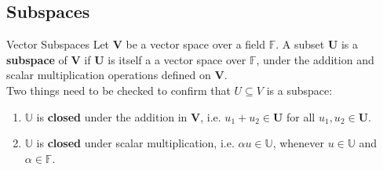 \documentclass[a4paper, 9pt]{extarticle}
\begin{document}
\subsection{Subspaces}
\begin{definitionbox}{Vector Subspaces}{}
  Let $\mathbf{V}$ be a vector space over a field $\mathbb{F}$. A subset $\mathbf{U}$ is a \textbf{subspace} of $\mathbf{V}$ if $\mathbf{U}$ is itself a a vector space over $\mathbb{F}$, under  the addition and scalar multiplication operations defined on $\mathbf{V}$.\\[2ex]

  Two things need to be checked to confirm that $U \subseteq V$ is a subspace:
  \begin{enumerate}
    \item $\mathbb{U}$ is \textbf{closed} under the addition in $\mathbf{V}$, i.e. $u_1 + u_2 \in \mathbf{U}$ for all $u_1,u_2 \in \mathbf{U}$.
    \item $\mathbb{U}$ is \textbf{closed} under scalar multiplication, i.e. $\alpha u \in \mathbb{U}$, whenever $u \in \mathbb{U}$ and $\alpha \in \mathbb{F}$.
  \end{enumerate}
\end{definitionbox}
\end{document}
